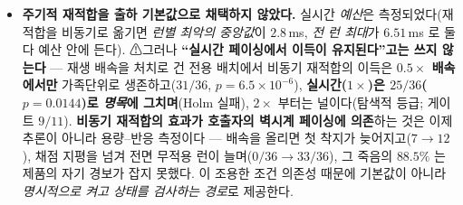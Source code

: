 \documentclass[11pt]{report}
\numberwithin{equation}{chapter}
\numberwithin{figure}{chapter}
\numberwithin{table}{chapter}
\begin{document}
\begin{itemize}
  \item \textbf{주기적 재적합을 출하 기본값으로 채택하지 않았다.}
        실시간 \emph{예산}은 측정되었다(재적합을 비동기로 옮기면
        \emph{런별 최악의 중앙값}이 $2.8$\,ms, \emph{전 런 최대}가 $6.51$\,ms 로 둘 다
        예산 안에 든다). ⚠그러나 \textbf{``실시간 페이싱에서 이득이 유지된다''고는 쓰지
        않는다} --- 재생 배속을 처치로 건 전용 배치에서 비동기 재적합의 이득은
        \textbf{$0.5\times$ 배속에서만} 가족단위로 생존하고($31/36$, $p = 6.5\times10^{-6}$),
        \textbf{실시간($1\times$)은 $25/36$($p = 0.0144$)로 \emph{명목}에 그치며}(Holm 실패),
        $2\times$ 부터는 널이다(탐색적 등급; 게이트 $9/11$).
        \textbf{비동기 재적합의 효과가 호출자의 벽시계 페이싱에 의존}하는 것은 이제 추론이
        아니라 용량--반응 측정이다 --- 배속을 올리면 첫 착지가 늦어지고($7 \to 12$), 채점
        지평을 넘겨 전면 무적용 런이 늘며($0/36 \to 33/36$), 그 죽음의 $88.5\%$ 는 제품의
        자기 경보가 잡지 못했다.
        이 조용한 조건 의존성 때문에 기본값이 아니라 \emph{명시적으로 켜고 상태를 검사하는
        경로}로 제공한다.


\end{itemize}
\end{document}
